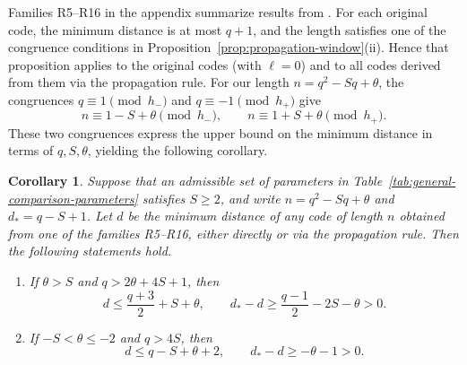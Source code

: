 \documentclass[preprint,12pt,a4paper]{elsarticle}
\newtheorem{corollary}[theorem]{Corollary}
\begin{document}
Families R5--R16 in the appendix summarize results from \cite{WangLuo2024,BarberoLucasEtAl2024,WanZhengZhu2025,WanLianZhu2025}. For each original code, the minimum distance is at most $q+1$, and the length satisfies one of the congruence conditions in Proposition~\ref{prop:propagation-window}\textup{(ii)}. Hence that proposition applies to the original codes (with $\ell=0$) and to all codes derived from them via the propagation rule. For our length $n=q^2-Sq+\theta$, the congruences $q\equiv1\pmod{h_-}$ and $q\equiv-1\pmod{h_+}$ give
\[
 n\equiv1-S+\theta\pmod{h_-},
 \qquad n\equiv1+S+\theta\pmod{h_+}.
\]
These two congruences express the upper bound on the minimum distance in terms of $q,S,\theta$, yielding the following corollary.

\begin{corollary}\label{cor:coset-explicit-improvement}
Suppose that an admissible set of parameters in Table~\ref{tab:general-comparison-parameters} satisfies $S\ge2$, and write $n=q^2-Sq+\theta$ and $d_*=q-S+1$. Let $d$ be the minimum distance of any code of length $n$ obtained from one of the families R5--R16, either directly or via the propagation rule. Then the following statements hold.
\begin{enumerate}[label=\textup{(\roman*)}]
\item If $\theta>S$ and $q>2\theta+4S+1$, then
\[
 d\le\frac{q+3}{2}+S+\theta,\qquad
 d_*-d\ge\frac{q-1}{2}-2S-\theta>0.
\]
\item If $-S<\theta\le-2$ and $q>4S$, then
\[
 d\le q-S+\theta+2,\qquad
 d_*-d\ge-\theta-1>0.
\]
\end{enumerate}
\end{corollary}
\end{document}
